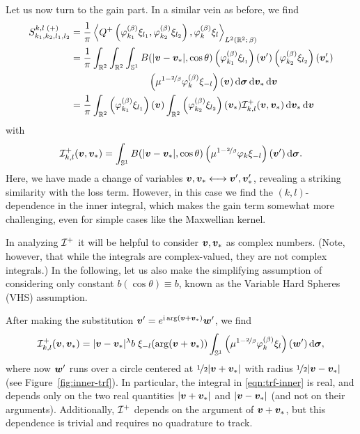Let us now turn to the gain part. In a similar vein as before, we find
\begin{align*}
    S_{k_1,k_2,l_1,l_2}^{k,l\;(+)} 
    &= \frac{1}{\pi} \left\langle Q^+\left(\varphi^{(\beta)}_{k_1} \xi_{l_1},
    \varphi^{(\beta)}_{k_2} \xi_{l_2}\right), \varphi^{(\beta)}_k \xi_l \right\rangle_{L^2(\mathbb{R}^2;\,\beta)} \\
    &= \frac{1}{\pi} \int_{\mathbb{R}^2}\int_{\mathbb{R}^2}\int_{\mathbb{S}^1}B(|{\bm v}-{\bm v}_\ast|,\cos\theta)
    \left(\varphi^{(\beta)}_{k_1}\xi_{l_1}\right)({\bm v}')
    \left(\varphi^{(\beta)}_{k_2}\xi_{l_2}\right)({\bm v}_\ast') \\
    & \qquad\qquad\qquad\qquad
    \left(\mu^{1-\nicefrac{2}{\beta}}\varphi^{(\beta)}_{k}\xi_{-l}\right)({\bm v})
    \,\mathrm{d}{\bm\sigma}\,\mathrm{d}{\bm v}_\ast\,\mathrm{d}{\bm v} \\
    &= \frac{1}{\pi}
    \int_{\mathbb{R}^2} \left(\varphi^{(\beta)}_{k_1}\xi_{l_1}\right)({\bm v})
    \int_{\mathbb{R}^2} \left(\varphi^{(\beta)}_{k_2}\xi_{l_2}\right)({\bm v}_\ast)
    \mathcal{I}_{k,l}^+({\bm v},{\bm v}_\ast)\,\mathrm{d}{\bm v}_\ast\,\mathrm{d}{\bm v}
\end{align*}
with
\begin{equation} \label{eqn:inner-trf-before}
    \mathcal{I}_{k,l}^+({\bm v},{\bm v}_\ast) = \int_{\mathbb{S}^1} B(|{\bm v}-{\bm v}_\ast|, \cos\theta) 
    \left(\mu^{1-\nicefrac{2}{\beta}}\varphi_{k}\xi_{-l}\right)({\bm v}') \,\mathrm{d}{\bm\sigma}.
\end{equation}
Here, we have made a change of variables ${\bm v},{\bm v}_\ast \longleftrightarrow {\bm v}',{\bm v}_\ast'$, revealing a
striking similarity with the loss term. However, in this case we find the $(k,l)$-dependence in the inner
integral, which makes the gain term somewhat more challenging, even for simple cases like the Maxwellian
kernel.

In analyzing $\mathcal{I}^+$ it will be helpful to consider ${\bm v},{\bm v}_\ast$ as complex numbers. (Note, however, that
while the integrals are complex-valued, they are not complex integrals.) In the following, let us also make
the simplifying assumption of considering only constant $b(\cos\theta)\equiv b$, known as the Variable Hard
Spheres (VHS) assumption.

After making the substitution ${\bm v}'=e^{\mathrm{i}\arg({\bm v}+{\bm v}_\ast)}{\bm w}'$, we find
\begin{equation} \label{eqn:trf-inner}
    \mathcal{I}_{k,l}^+({\bm v},{\bm v}_\ast) = |{\bm v}-{\bm v}_\ast|^\lambda b\;\xi_{-l}(\arg({\bm v}+{\bm v}_\ast))\int_{\mathbb{S}^1}
    \left(\mu^{1-\nicefrac{2}{\beta}}\varphi^{(\beta)}_k\xi_l\right)({\bm w}')\,\mathrm{d}{\bm\sigma},
\end{equation}
where now ${\bm w}'$ runs over a circle centered at $\nicefrac{1}{2}|{\bm v}+{\bm v}_\ast|$ with radius
$\nicefrac{1}{2}|{\bm v}-{\bm v}_\ast|$ (see Figure~\ref{fig:inner-trf}). In particular, the integral in
\eqref{eqn:trf-inner} is real, and depends only on the two real quantities $|{\bm v}+{\bm v}_\ast|$ and
$|{\bm v}-{\bm v}_\ast|$ (and not on their arguments).  Additionally, $\mathcal{I}^+$ depends on the argument of
${\bm v}+{\bm v}_\ast$, but this dependence is trivial and requires no quadrature to track.

